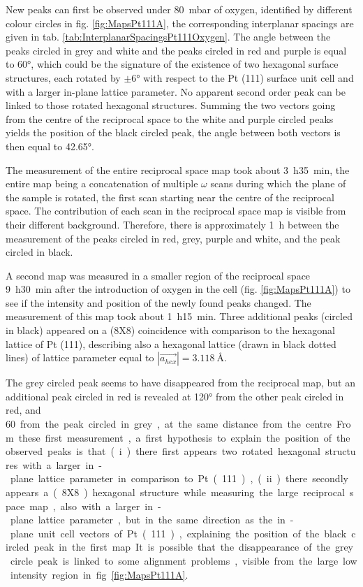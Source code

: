 New peaks can first be observed under \qty{80}{\milli\bar} of oxygen, identified by different colour circles in fig. \ref{fig:MapsPt111A}, the corresponding interplanar spacings are given in tab. \ref{tab:InterplanarSpacingsPt111Oxygen}.
The angle between the peaks circled in grey and white and the peaks circled in red and purple is equal to \ang{60}, which could be the signature of the existence of two hexagonal surface structures, each rotated by $\pm \ang{6}$ with respect to the Pt (111) surface unit cell and with a larger in-plane lattice parameter.
No apparent second order peak can be linked to those rotated hexagonal structures.
Summing the two vectors going from the centre of the reciprocal space to the white and purple circled peaks yields the position of the black circled peak, the angle between both vectors is then equal to \ang{42.65}.

The measurement of the entire reciprocal space map took about \qty{3}{\hour}\qty{35}{\minute}, the entire map being a concatenation of multiple $\omega$ scans during which the plane of the sample is rotated, the first scan starting near the centre of the reciprocal space.
The contribution of each scan in the reciprocal space map is visible from their different background.
Therefore, there is approximately \qty{1}{\hour} between the measurement of the peaks circled in red, grey, purple and white, and the peak circled in black.

A second map was measured in a smaller region of the reciprocal space \qty{9}{\hour}\qty{30}{\minute} after the introduction of oxygen in the cell (fig. \ref{fig:MapsPt111A}) to see if the intensity and position of the newly found peaks changed.
The measurement of this map took about \qty{1}{\hour}\qty{15}{\minute}.
Three additional peaks (circled in black) appeared on a (8X8) coincidence with comparison to the hexagonal lattice of Pt (111), describing also a hexagonal lattice (drawn in black dotted lines) of lattice parameter equal to $|\vec{a_{hex}}| = \qty{3.118}{\angstrom}$.

The grey circled peak seems to have disappeared from the reciprocal map, but an additional peak circled in red is revealed at \ang{120} from the other peak circled in red, and \qty{60} from the peak circled in grey, at the same distance from the centre.
From these first measurement, a first hypothesis to explain the position of the observed peaks is that (i) there first appears two rotated hexagonal structures with a larger in-plane lattice parameter in comparison to Pt (111), (ii) there secondly appears a (8X8) hexagonal structure while measuring the large reciprocal space map, also with a larger in-plane lattice parameter, but in the same direction as the in-plane unit cell vectors of Pt (111), explaining the position of the black circled peak in the first map.
It is possible that the disappearance of the grey circle peak is linked to some alignment problems, visible from the large low intensity region in fig. \ref{fig:MapsPt111A}.

